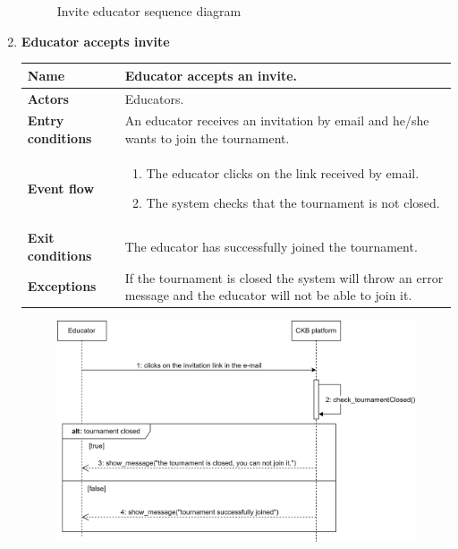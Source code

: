 \begin{enumerate}[label=\textbf{UC.\arabic*}]
\begin{figure}[h]
            \caption{Invite educator sequence diagram}
            \label{fig:sd-inviteE}
        \end{figure}
        \clearpage
        \item {} \textbf{Educator accepts invite}
        \begin{table}[h]
    	    \centering
                \renewcommand{\arraystretch}{1.5}
                \begin{tabular}{|m{3.2cm}|m{9.8cm}|}
                    \hline
                    \textbf{Name} & Educator accepts an invite. \\
                    \hline
                    \textbf{Actors} & Educators. \\
                    \hline
                    \textbf{Entry conditions}  & An educator receives an invitation by email and he/she wants to join the tournament. \\
                    \hline
                    \textbf{Event flow}  & 
                    \begin{enumerate}[label=\arabic*.]
                        \item The educator clicks on the link received by email.
                        \item The system checks that the tournament is not closed.
                    \end{enumerate}\\ 
                    \hline
                    \textbf{Exit conditions}  & The educator has successfully joined the tournament. \\
                    \hline
                    \textbf{Exceptions}  & If the tournament is closed the system will throw an error message and the educator will not be able to join it. \\
                    \hline 
                \end{tabular}
        \end{table}
        \begin{figure}[h]
            \centering
            \includegraphics[scale = 0.7]{images/sd/acceptsE.png}

\end{figure}
\end{enumerate}
